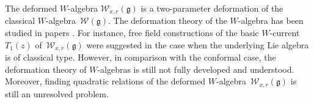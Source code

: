 \documentclass[pdftex]{sigma}
\numberwithin{equation}{section}
\begin{document}
The deformed $W$-algebra ${\mathcal W}_{x,r}({\mathfrak g})$ is a two-parameter
deformation of the classical $W$-al\-ge\-bra~${\mathcal W}({\mathfrak g})$.
The deformation theory of the $W$-algebra has been studied in
{papers}
\cite{
Awata-Kubo-Odake-Shiraishi,Brazhnikov-Lukyanov,Ding-Feigin,
Feigin-Frenkel,Feigin-Jimbo-Mukhin-Vilkoviskiy,
Frenkel-Reshetikhin1,
Harada-Matsuo-Noshita-Watanabe,
Kojima2,Kojima1,
Odake,Sevostyanov,
Shiraishi-Kubo-Awata-Odake}.
For instance, free field constructions of the basic $W$-current $T_1(z)$ of~${\mathcal W}_{x,r}({\mathfrak g})$ were
{suggested in the case when the underlying Lie algebra is of classical type.}
However, in comparison with the conformal case,
the deformation theory of $W$-algebras
is still not fully developed and understood.
Moreover, finding quadratic relations of the deformed
$W$-algebra~${\mathcal W}_{x,r}({\mathfrak g})$ is still an unresolved problem.
\end{document}
